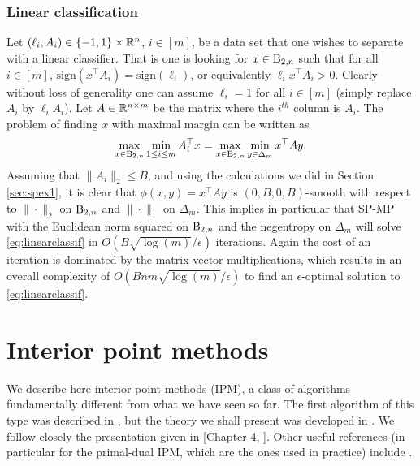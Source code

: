 \subsubsection{Linear classification} \label{sec:spex3}
Let $(\ell_i, A_i) \in \{-1,1\} \times \mathbb{R}^n$, $i \in [m]$, be a data set that one wishes to separate with a linear classifier. That is one is looking for $x \in \mathrm{B}_{2,n}$ such that for all $i \in [m]$, $\mathrm{sign}(x^{\top} A_i) = \mathrm{sign}(\ell_i)$, or equivalently $\ell_i x^{\top} A_i > 0$. Clearly without loss of generality one can assume $\ell_i = 1$ for all $i \in [m]$ (simply replace $A_i$ by $\ell_i A_i$). Let $A \in \mathbb{R}^{n \times m}$ be the matrix where the $i^{th}$ column is $A_i$. The problem of finding $x$ with maximal margin can be written as
\begin{equation} \label{eq:linearclassif}
\max_{x \in \mathrm{B}_{2,n}} \min_{1 \leq i \leq m} A_i^{\top} x = \max_{x \in \mathrm{B}_{2,n}} \min_{y \in \Delta_m} x^{\top} A y .
\end{equation}
Assuming that $\|A_i\|_2 \leq B$, and using the calculations we did in Section \ref{sec:spex1}, it is clear that $\phi(x,y) = x^{\top} A y$ is $(0, B, 0, B)$-smooth with respect to $\|\cdot\|_2$ on $\mathrm{B}_{2,n}$ and $\|\cdot\|_1$ on $\Delta_m$. This implies in particular that SP-MP with the Euclidean norm squared on $\mathrm{B}_{2,n}$ and the negentropy on $\Delta_m$ will solve \eqref{eq:linearclassif} in $O(B \sqrt{\log(m)} / \epsilon)$ iterations. Again the cost of an iteration is dominated by the matrix-vector multiplications, which results in an overall complexity of $O(B n m \sqrt{\log(m)} / \epsilon)$ to find an $\epsilon$-optimal solution to \eqref{eq:linearclassif}.

\section{Interior point methods} \label{sec:IPM}
We describe here interior point methods (IPM), a class of algorithms fundamentally different from what we have seen so far. The first algorithm of this type was described in \cite{Kar84}, but the theory we shall present was developed in \cite{NN94}. We follow closely the presentation given in [Chapter 4, \cite{Nes04}]. Other useful references (in particular for the primal-dual IPM, which are the ones used in practice) include \cite{Ren01, Nem04b, NW06}.
\newline

